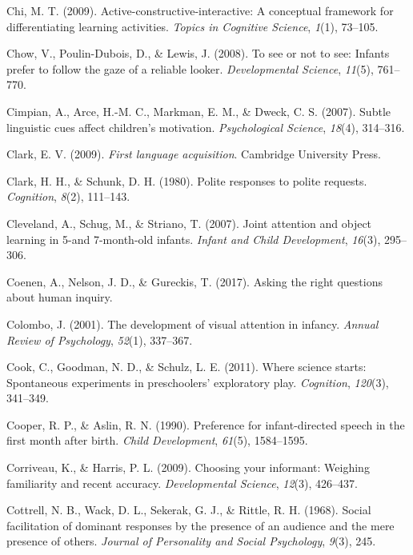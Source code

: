 \documentclass[oneside]{report}
\begin{document}
\hypertarget{ref-chi2009active}{}
Chi, M. T. (2009). Active-constructive-interactive: A conceptual
framework for differentiating learning activities. \emph{Topics in
Cognitive Science}, \emph{1}(1), 73--105.

\hypertarget{ref-chow2008see}{}
Chow, V., Poulin-Dubois, D., \& Lewis, J. (2008). To see or not to see:
Infants prefer to follow the gaze of a reliable looker.
\emph{Developmental Science}, \emph{11}(5), 761--770.

\hypertarget{ref-cimpian2007subtle}{}
Cimpian, A., Arce, H.-M. C., Markman, E. M., \& Dweck, C. S. (2007).
Subtle linguistic cues affect children's motivation. \emph{Psychological
Science}, \emph{18}(4), 314--316.

\hypertarget{ref-clark2009first}{}
Clark, E. V. (2009). \emph{First language acquisition}. Cambridge
University Press.

\hypertarget{ref-clark1980}{}
Clark, H. H., \& Schunk, D. H. (1980). Polite responses to polite
requests. \emph{Cognition}, \emph{8}(2), 111--143.

\hypertarget{ref-cleveland2007joint}{}
Cleveland, A., Schug, M., \& Striano, T. (2007). Joint attention and
object learning in 5-and 7-month-old infants. \emph{Infant and Child
Development}, \emph{16}(3), 295--306.

\hypertarget{ref-coenen2017asking}{}
Coenen, A., Nelson, J. D., \& Gureckis, T. (2017). Asking the right
questions about human inquiry.

\hypertarget{ref-colombo2001development}{}
Colombo, J. (2001). The development of visual attention in infancy.
\emph{Annual Review of Psychology}, \emph{52}(1), 337--367.

\hypertarget{ref-cook2011science}{}
Cook, C., Goodman, N. D., \& Schulz, L. E. (2011). Where science starts:
Spontaneous experiments in preschoolers' exploratory play.
\emph{Cognition}, \emph{120}(3), 341--349.

\hypertarget{ref-cooper1990preference}{}
Cooper, R. P., \& Aslin, R. N. (1990). Preference for infant-directed
speech in the first month after birth. \emph{Child Development},
\emph{61}(5), 1584--1595.

\hypertarget{ref-corriveau2009choosing}{}
Corriveau, K., \& Harris, P. L. (2009). Choosing your informant:
Weighing familiarity and recent accuracy. \emph{Developmental Science},
\emph{12}(3), 426--437.

\hypertarget{ref-cottrell1968social}{}
Cottrell, N. B., Wack, D. L., Sekerak, G. J., \& Rittle, R. H. (1968).
Social facilitation of dominant responses by the presence of an audience
and the mere presence of others. \emph{Journal of Personality and Social
Psychology}, \emph{9}(3), 245.
\end{document}
